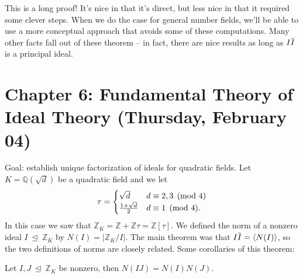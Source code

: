 \begin{remark}

This is a long proof! It's nice in that it's direct, but less nice in
that it required some clever steps. When we do the case for general
number fields, we'll be able to use a more conceptual approach that
avoids some of these computations. Many other facts fall out of these
theorem -- in fact, there are nice results as long as
\(I \mkern 1.5mu\overline{\mkern-1.5muI\mkern-1.5mu}\mkern 1.5mu\) is a
principal ideal.

\end{remark}

\hypertarget{chapter-6-fundamental-theory-of-ideal-theory-thursday-february-04}{%
\section{Chapter 6: Fundamental Theory of Ideal Theory (Thursday,
February
04)}\label{chapter-6-fundamental-theory-of-ideal-theory-thursday-february-04}}

\begin{remark}

Goal: establish unique factorization of ideals for quadratic fields. Let
\(K = {\mathbb{Q}}(\sqrt d)\) be a quadratic field and we let
\begin{align*}
\tau = 
\begin{cases}
\sqrt d & d \equiv 2,3 \pmod 4  
\\
{1 + \sqrt{d} \over 2} & d \equiv 1 \pmod 4.
\end{cases}
\end{align*}
In this case we saw that
\({\mathbb{Z}}_K = {\mathbb{Z}}+ {\mathbb{Z}}\tau = {\mathbb{Z}}[\tau]\).
We defined the norm of a nonzero ideal
\(I{~\trianglelefteq~}{\mathbb{Z}}_K\) by
\(N(I) = {\left\lvert {{\mathbb{Z}}_K/I} \right\rvert}\). The main
theorem was that
\(I \mkern 1.5mu\overline{\mkern-1.5muI\mkern-1.5mu}\mkern 1.5mu = \left\langle{ N(I)}\right\rangle\),
so the two definitions of norms are closely related. Some corollaries of
this theorem:

\end{remark}

\begin{corollary}[?]

Let \(I, J {~\trianglelefteq~}{\mathbb{Z}}_K\) be nonzero, then
\(N(IJ) = N(I) N(J)\).

\end{corollary}


